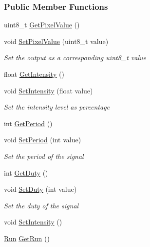\subsubsection*{Public Member Functions}
\begin{DoxyCompactItemize}
\item 
uint8\+\_\+t \hyperlink{class_hardware_1_1_p_w_m_a1eb3801b19831147129440bf35c29b7f}{Get\+Pixel\+Value} ()
\item 
void \hyperlink{class_hardware_1_1_p_w_m_ad9b2d460ab02f958653ff29b4cb62a80}{Set\+Pixel\+Value} (uint8\+\_\+t value)
\begin{DoxyCompactList}\small\item\em Set the output as a corresponding uint8\+\_\+t value \end{DoxyCompactList}\item 
float \hyperlink{class_hardware_1_1_p_w_m_a03b291fccd76436faf7d8efb415a4aa7}{Get\+Intensity} ()
\item 
void \hyperlink{class_hardware_1_1_p_w_m_ad6c6bb44a237454c86c1c28330f76afe}{Set\+Intensity} (float value)
\begin{DoxyCompactList}\small\item\em Set the intensity level as percentage \end{DoxyCompactList}\item 
int \hyperlink{class_hardware_1_1_p_w_m_a61652657a00420607e184d7cf2627202}{Get\+Period} ()
\item 
void \hyperlink{class_hardware_1_1_p_w_m_a205b979fa8b87d25b01ac8e8d0f06fb6}{Set\+Period} (int value)
\begin{DoxyCompactList}\small\item\em Set the period of the signal \end{DoxyCompactList}\item 
int \hyperlink{class_hardware_1_1_p_w_m_abc213166a3e5f725fe8eb810bdf63085}{Get\+Duty} ()
\item 
void \hyperlink{class_hardware_1_1_p_w_m_a93ea3627da17bf143ac548cbd623d13d}{Set\+Duty} (int value)
\begin{DoxyCompactList}\small\item\em Set the duty of the signal \end{DoxyCompactList}\item 
void \hyperlink{class_hardware_1_1_p_w_m_abf855c57004d264ec066fbd1a87fd5a8}{Set\+Intensity} ()
\item 
\hyperlink{class_hardware_1_1_p_w_m_a6f1e614731154a3613c03a4238ddd107}{Run} \hyperlink{class_hardware_1_1_p_w_m_a74be17798a57dfa1e394444f1ce11a64}{Get\+Run} ()

\end{DoxyCompactItemize}
